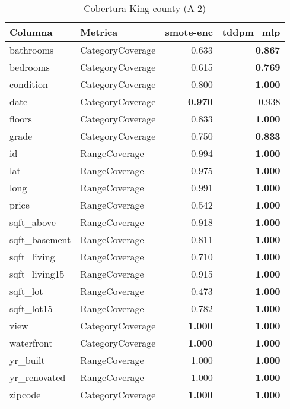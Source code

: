\begin{table}[H]
\centering
\caption{Cobertura King county (A-2)}
\label{table-coverage-king county-a-2}
\begin{tabular}{|l|l|r|r|}
\hline
\rowcolor[gray]{0.8}
Columna & Metrica & smote-enc & tddpm\_mlp \\
\hline bathrooms & CategoryCoverage & 0.633 & \bfseries 0.867 \\
\hline bedrooms & CategoryCoverage & 0.615 & \bfseries 0.769 \\
\hline condition & CategoryCoverage & 0.800 & \bfseries 1.000 \\
\hline date & CategoryCoverage & \bfseries 0.970 & 0.938 \\
\hline floors & CategoryCoverage & 0.833 & \bfseries 1.000 \\
\hline grade & CategoryCoverage & 0.750 & \bfseries 0.833 \\
\hline id & RangeCoverage & 0.994 & \bfseries 1.000 \\
\hline lat & RangeCoverage & 0.975 & \bfseries 1.000 \\
\hline long & RangeCoverage & 0.991 & \bfseries 1.000 \\
\hline price & RangeCoverage & 0.542 & \bfseries 1.000 \\
\hline sqft\_above & RangeCoverage & 0.918 & \bfseries 1.000 \\
\hline sqft\_basement & RangeCoverage & 0.811 & \bfseries 1.000 \\
\hline sqft\_living & RangeCoverage & 0.710 & \bfseries 1.000 \\
\hline sqft\_living15 & RangeCoverage & 0.915 & \bfseries 1.000 \\
\hline sqft\_lot & RangeCoverage & 0.473 & \bfseries 1.000 \\
\hline sqft\_lot15 & RangeCoverage & 0.782 & \bfseries 1.000 \\
\hline view & CategoryCoverage & \bfseries 1.000 & \bfseries 1.000 \\
\hline waterfront & CategoryCoverage & \bfseries 1.000 & \bfseries 1.000 \\
\hline yr\_built & RangeCoverage & 1.000 & \bfseries 1.000 \\
\hline yr\_renovated & RangeCoverage & 1.000 & \bfseries 1.000 \\
\hline zipcode & CategoryCoverage & \bfseries 1.000 & \bfseries 1.000 \\
\hline
\end{tabular}
\end{table}
